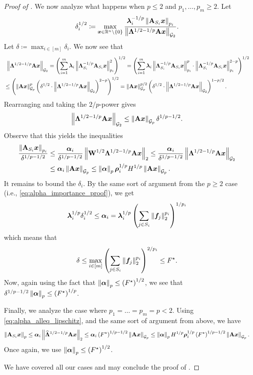 \documentclass[11pt]{article}
\numberwithin{equation}{section}
\begin{document}
\begin{proof}[Proof of ]
We now analyze what happens when $p \le 2$ and $p_1,\dots,p_m \ge 2$. Let
\begin{align*}
    \delta_i^{1/2} \coloneqq \max_{\bm{x}\in\mathbb{R}^n\setminus\left\{0\right\}}\frac{\bm{\lambda}_i^{-1/p}\left\lVert \mathbf{A}_{S_i}\bm{x} \right\rVert_{p_i}}{\left\lVert \mathbf{\Lambda}^{1/2-1/p}\mathbf{A}\bm{x} \right\rVert_{\mathcal{G}_{2}}}.
\end{align*}
Let $\delta \coloneqq \max_{i \in [m]} \delta_i$. We now see that
\begin{align*}
    &\ \left\lVert \mathbf{\Lambda}^{1/2-1/p}\mathbf{A}\bm{x} \right\rVert_{\mathcal{G}_{2}} = \left(\sum_{i=1}^m \bm{\lambda}_i\left\lVert \mathbf{\Lambda}_{S_i}^{-1/p}\mathbf{A}_{S_i}\bm{x} \right\rVert_{p_i}^2\right)^{1/2} = \left(\sum_{i=1}^m \bm{\lambda}_i\left\lVert \mathbf{\Lambda}_{S_i}^{-1/p}\mathbf{A}_{S_i}\bm{x} \right\rVert_{p_i}^{p}\cdot\left\lVert \mathbf{\Lambda}_{S_i}^{-1/p}\mathbf{A}_{S_i}\bm{x} \right\rVert_{p_i}^{2-p}\right)^{1/2} \\
    &\le \left(\left\lVert \mathbf{A}\bm{x} \right\rVert_{\mathcal{G}_{p}}^p\left(\delta^{1/2} \cdot \left\lVert \mathbf{\Lambda}^{1/2-1/p}\mathbf{A}\bm{x} \right\rVert_{\mathcal{G}_{2}}\right)^{2-p}\right)^{1/2} = \left\lVert \mathbf{A}\bm{x} \right\rVert_{\mathcal{G}_{p}}^{p/2}\left(\delta^{1/2} \cdot \left\lVert \mathbf{\Lambda}^{1/2-1/p}\mathbf{A}\bm{x} \right\rVert_{\mathcal{G}_{2}}\right)^{1-p/2}.
\end{align*}
Rearranging and taking the $2/p$-power gives
\begin{align*}
    \left\lVert \mathbf{\Lambda}^{1/2-1/p}\mathbf{A}\bm{x} \right\rVert_{\mathcal{G}_{2}} \le \left\lVert \mathbf{A}\bm{x} \right\rVert_{\mathcal{G}_{p}} \delta^{1/p-1/2}.
\end{align*}
Observe that this yields the inequalities
\begin{align*}
     \frac{\left\lVert \mathbf{A}_{S_i}\bm{x} \right\rVert_{p_i}}{\delta^{1/p-1/2}} &\le \frac{\bm{\alpha}_i}{\delta^{1/p-1/2}}\left\lVert \mathbf{W}^{1/2}\mathbf{\Lambda}^{1/2-1/p}\mathbf{A}\bm{x} \right\rVert_2 \le \frac{\bm{\alpha}_i}{\delta^{1/p-1/2}}\left\lVert \mathbf{\Lambda}^{1/2-1/p}\mathbf{A}\bm{x} \right\rVert_{\mathcal{G}_{2}} \\
     &\le \bm{\alpha}_i\left\lVert \mathbf{A}\bm{x} \right\rVert_{\mathcal{G}_{p}} \le \left\lVert \bm{\alpha} \right\rVert_p\bm{\rho}_i^{1/p}H^{1/p}\left\lVert \mathbf{A}\bm{x} \right\rVert_{\mathcal{G}_{p}}.
\end{align*}
It remains to bound the $\delta_i$. By the same sort of argument from the $p\ge 2$ case (i.e., \eqref{eq:alpha_importance_proof}), we get
\begin{align*}
    \bm{\lambda}_i^{1/p}\delta_i^{1/2} \le \bm{\alpha}_i = \bm{\lambda}_i^{1/p}\left(\sum_{j \in S_i} \left\lVert \bm{f}_j \right\rVert_2^{p_i}\right)^{1/p_i}
\end{align*}
which means that
\begin{align*}
    \delta \le \max_{i \in [m]} \left(\sum_{j \in S_i} \left\lVert \bm{f}_j \right\rVert_2^{p_i}\right)^{2/p_i} \le F^{\star}.
\end{align*}
Now, again using the fact that $\left\lVert \bm{\alpha} \right\rVert_p \le \left(F^{\star}\right)^{1/2}$, we see that $\delta^{1/p-1/2}\left\lVert \bm{\alpha} \right\rVert_p \le \left(F^{\star}\right)^{1/p}$. 

Finally, we analyze the case where $p_1=\dots=p_m=p < 2$. Using \eqref{eq:alpha_alleq_lipschitz}, and the same sort of argument from above, we have
\begin{align*}
    \left\lVert \mathbf{A}_{S_i}\bm{x} \right\rVert_p \le \bm{\alpha}_i\left\lVert \widehat{\mathbf{\Lambda}}^{1/2-1/p}\mathbf{A}\bm{x} \right\rVert_2 \le \bm{\alpha}_i\left(F^{\star}\right)^{1/p-1/2}\left\lVert \mathbf{A}\bm{x} \right\rVert_{\mathcal{G}_{p}} \le \left\lVert \bm{\alpha} \right\rVert_pH^{1/p}\bm{\rho}_i^{1/p}\left(F^{\star}\right)^{1/p-1/2}\left\lVert \mathbf{A}\bm{x} \right\rVert_{\mathcal{G}_{p}}.
\end{align*}
Once again, we use $\left\lVert \bm{\alpha} \right\rVert_p \le \left(F^{\star}\right)^{1/2}$.

We have covered all our cases and may conclude the proof of .
\end{proof}
\end{document}
